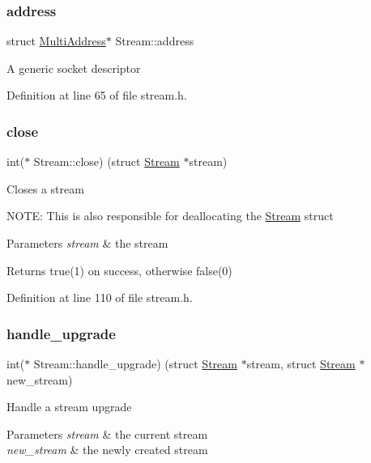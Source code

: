 \subsubsection{\texorpdfstring{address}{address}}
{\footnotesize\ttfamily struct \mbox{\hyperlink{struct_multi_address}{Multi\+Address}}$\ast$ Stream\+::address}

A generic socket descriptor 

Definition at line 65 of file stream.\+h.

\mbox{\label{struct_stream_aac06dde158b42477ea8c1a8808cce86a}} 
\subsubsection{\texorpdfstring{close}{close}}
{\footnotesize\ttfamily int($\ast$ Stream\+::close) (struct \mbox{\hyperlink{struct_stream}{Stream}} $\ast$stream)}

Closes a stream

N\+O\+TE\+: This is also responsible for deallocating the \mbox{\hyperlink{struct_stream}{Stream}} struct 
\begin{DoxyParams}{Parameters}
{\em stream} & the stream \\
\hline
\end{DoxyParams}
\begin{DoxyReturn}{Returns}
true(1) on success, otherwise false(0) 
\end{DoxyReturn}


Definition at line 110 of file stream.\+h.

\mbox{\label{struct_stream_a54b3ad336198807f766a31db287cb29a}} 
\subsubsection{\texorpdfstring{handle\+\_\+upgrade}{handle\_upgrade}}
{\footnotesize\ttfamily int($\ast$ Stream\+::handle\+\_\+upgrade) (struct \mbox{\hyperlink{struct_stream}{Stream}} $\ast$stream, struct \mbox{\hyperlink{struct_stream}{Stream}} $\ast$new\+\_\+stream)}

Handle a stream upgrade 
\begin{DoxyParams}{Parameters}
{\em stream} & the current stream \\
\hline
{\em new\+\_\+stream} & the newly created stream \\
\hline
\end{DoxyParams}


